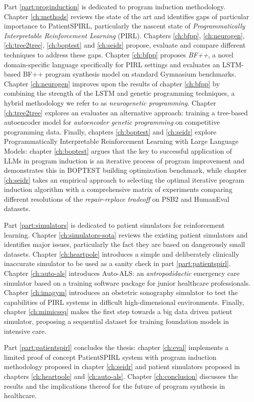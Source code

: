 Part \ref{part:proginduction} is dedicated to program induction methodology.
Chapter \ref{ch:methods} reviews the state of the art and identifies gaps of particular importance to PatientSPIRL, particularly the nascent state of \emph{Programmatically Interpretable Reinforcement Learning} (PIRL).
Chapters \ref{ch:bfpp}, \ref{ch:neurogen}, \ref{ch:tree2tree}, \ref{ch:boptest} and \ref{ch:seidr} propose, evaluate and compare different techniques to address these gaps.
Chapter \ref{ch:bfpp} proposes \emph{BF++}, a novel domain-specific language specifically for PIRL settings and evaluates an LSTM-based BF++ program synthesis model on standard Gymnasium \cite{towersGymnasiumStandardInterface2024} benchmarks.
Chapter \ref{ch:neurogen} improves upon the results of chapter \ref{ch:bfpp} by combining the strength of the LSTM and genetic programming techniques, a hybrid methodology we refer to as \emph{neurogenetic programming}.
Chapter \ref{ch:tree2tree} explores an evaluates an alternative approach: training a tree-based autoencoder model for \emph{autoencoder genetic programming} on competitive programming data.
Finally, chapters \ref{ch:boptest} and \ref{ch:seidr} explore Programmatically Interpretable Reinforcement Learning with Large Language Models: chapter \ref{ch:boptest} argues that the key to successful application of LLMs in program induction is an iterative process of program improvement and demonstrates this in BOPTEST building optimization benchmark, while chapter \ref{ch:seidr} takes an empirical approach to selecting the optimal iterative program induction algorithm with a comprehensive matrix of experiments comparing different resolutions of the \emph{repair-replace tradeoff} on PSB2 and HumanEval datasets.

Part \ref{part:simulators} is dedicated to patient simulators for reinforcement learning.
Chapter \ref{ch:simulators-sota} reviews the existing patient simulators and identifies major issues, particularly the fact they are based on dangerously small datasets.
Chapter \ref{ch:heartpole} introduces a simple and deliberately clinically inaccurate simulator to be used as a sanity check in part \ref{part:patientspirl}.
Chapter \ref{ch:auto-als} introduces Auto-ALS: an \emph{antropodidactic} emergency care simulator based on a training software package for junior healthcare professionals.
Chapter \ref{ch:imagym} introduces an obstetric sonography simulator to test the capabilities of PIRL systems in difficult high-dimensional environments.
Finally, chapter \ref{ch:mimicseq} makes the first step towards a big data driven patient simulator, proposing a sequential dataset for training foundation models in intensive care.

Part \ref{part:patientspirl} concludes the thesis: chapter \ref{ch:eval} implements a limited proof of concept PatientSPIRL system with program induction methodology proposed in chapter \ref{ch:seidr} and patient simulators proposed in chapters \ref{ch:heartpole} and \ref{ch:auto-als}.
Chapter \ref{ch:conclusion} discusses the results and the implications thereof for the future of program synthesis in healthcare.